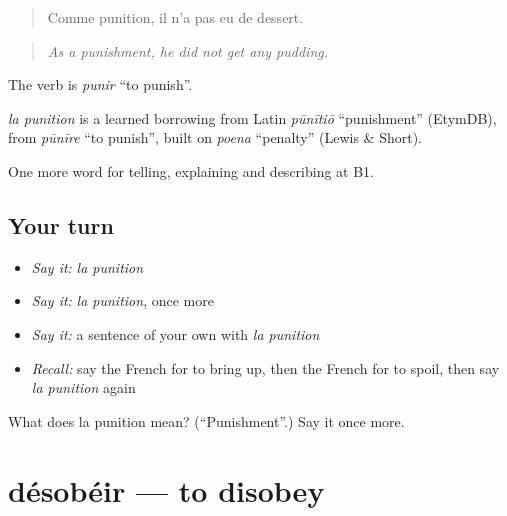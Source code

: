 \begin{quote}
Comme punition, il n'a pas eu de dessert.
\end{quote}

\begin{quote}
\emph{As a punishment, he did not get any pudding.}
\end{quote}

The verb is \emph{punir} \textquotedblleft{}to punish\textquotedblright{}.

\begin{cousinweb}
\emph{la punition} is a learned borrowing from Latin \emph{pūnītiō} \textquotedblleft{}punishment\textquotedblright{} (EtymDB), from \emph{pūnīre} \textquotedblleft{}to punish\textquotedblright{}, built on \emph{poena} \textquotedblleft{}penalty\textquotedblright{} (Lewis \& Short).
\end{cousinweb}

\begin{grammarlens}[title={What you've built}]
One more word for telling, explaining and describing at B1.
\end{grammarlens}

\subsection*{Your turn}
\begin{itemize}
\raggedright
  \item \emph{Say it:} \emph{la punition}
  \item \emph{Say it:} \emph{la punition}, once more
  \item \emph{Say it:} a sentence of your own with \emph{la punition}
  \item \emph{Recall:} say the French for to bring up, then the French for to spoil, then say \emph{la punition} again
\end{itemize}

\begin{tcolorbox}[breakable,colback=teal!4,colframe=teal!35!black,title={Before you move on}]
What does la punition mean? (\textquotedblleft{}Punishment\textquotedblright{}.) Say it once more.
\end{tcolorbox}
\section[désobéir]{désobéir — to disobey}

\label{lesson:FR-C494-desobeir}



